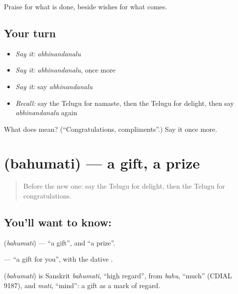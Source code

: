 \begin{grammarlens}[title={What you've built}]
Praise for what is done, beside wishes for what comes.
\end{grammarlens}

\subsection*{Your turn}
\begin{itemize}
\raggedright
  \item \emph{Say it:} \emph{abhinandanalu}
  \item \emph{Say it:} \emph{abhinandanalu}, once more
  \item \emph{Say it:} say \emph{abhinandanalu}
  \item \emph{Recall:} say the Telugu for namaste, then the Telugu for delight, then say \emph{abhinandanalu} again
\end{itemize}

\begin{tcolorbox}[breakable,colback=teal!4,colframe=teal!35!black,title={Before you move on}]
What does  mean? (\textquotedblleft{}Congratulations, compliments\textquotedblright{}.) Say it once more.
\end{tcolorbox}
\section[\texorpdfstring{\te{బహుమతి} (bahumati)}{బహుమతి (bahumati)}]{ (bahumati) — a gift, a prize}

\label{lesson:TE-C99-gift}



\begin{quote}
Before the new one: say the Telugu for delight, then the Telugu for congratulations.
\end{quote}

\subsection*{You'll want to know: }
\textbf{} (\emph{bahumati}) — \textquotedblleft{}a gift\textquotedblright{}, and \textquotedblleft{}a prize\textquotedblright{}.

\textbf{  } — \textquotedblleft{}a gift for you\textquotedblright{}, with the dative \textbf{}.

\begin{cousinweb}
\textbf{} (\emph{bahumati}) is Sanskrit \emph{bahumati}, \textquotedblleft{}high regard\textquotedblright{}, from \emph{bahu}, \textquotedblleft{}much\textquotedblright{} (CDIAL 9187), and \emph{mati}, \textquotedblleft{}mind\textquotedblright{}: a gift as a mark of regard.
\end{cousinweb}


